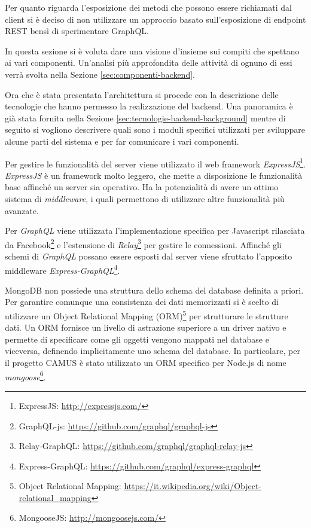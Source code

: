 Per quanto riguarda l'esposizione dei metodi che possono essere richiamati dal client si è deciso di non utilizzare un approccio basato sull'esposizione di endpoint REST bensì di sperimentare GraphQL.

In questa sezione si è voluta dare una visione d'insieme sui compiti che spettano ai vari componenti. Un'analisi più approfondita delle attività di ognuno di essi verrà svolta nella Sezione \ref{sec:componenti-backend}.

Ora che è stata presentata l'architettura si procede con la descrizione delle tecnologie che hanno permesso la realizzazione del backend. Una panoramica è già stata fornita nella Sezione \ref{sec:tecnologie-backend-background} mentre di seguito si vogliono descrivere quali sono i moduli specifici utilizzati per sviluppare alcune parti del sistema e per far comunicare i vari componenti.

Per gestire le funzionalità del server viene utilizzato il web framework \emph{ExpressJS}\footnote{ExpressJS: \url{http://expressjs.com/}}. \emph{ExpressJS} è un framework molto leggero, che mette a disposizione le funzionalità base affinché un server sia operativo. Ha la potenzialità di avere un ottimo sistema di \emph{middleware}, i quali permettono di utilizzare altre funzionalità più avanzate.

Per \emph{GraphQL} viene utilizzata l'implementazione specifica per Javascript rilasciata da Facebook\footnote{GraphQL-js: \url{https://github.com/graphql/graphql-js}} e l'estensione di \emph{Relay}\footnote{Relay-GraphQL: \url{https://github.com/graphql/graphql-relay-js}} per gestire le connessioni. Affinché gli schemi di \emph{GraphQL} possano essere esposti dal server viene sfruttato l'apposito middleware \emph{Express-GraphQL}\footnote{Express-GraphQL: \url{https://github.com/graphql/express-graphql}}.

MongoDB non possiede una struttura dello schema del database definita a priori. Per garantire comunque una consistenza dei dati memorizzati si è scelto di utilizzare un Object Relational Mapping (ORM)\footnote{Object Relational Mapping: \url{https://it.wikipedia.org/wiki/Object-relational_mapping}} per strutturare le strutture dati. Un ORM fornisce un livello di astrazione superiore a un driver nativo e permette di specificare come gli oggetti vengono mappati nel database e viceversa, definendo implicitamente uno schema del database. In particolare, per il progetto CAMUS è stato utilizzato un ORM specifico per Node.js di nome \emph{mongoose}\footnote{MongooseJS: \url{http://mongoosejs.com/}}.

